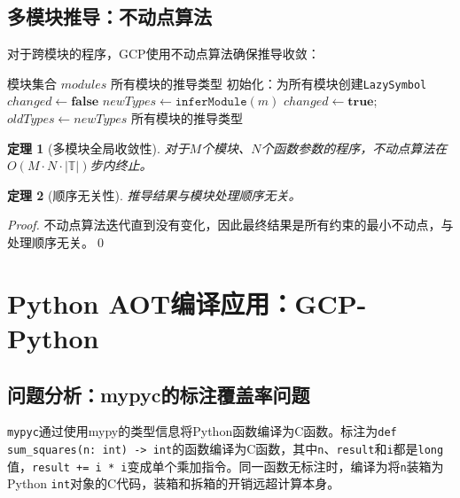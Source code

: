 \documentclass[UTF8]{article}
\newtheorem{theorem}{定理}[section]
\begin{document}
\subsection{多模块推导：不动点算法}
\label{sec:fixpoint}

对于跨模块的程序，GCP使用不动点算法确保推导收敛：

\begin{algorithm}[h]
\caption{多模块不动点推导}
\label{alg:fixpoint}
\begin{algorithmic}[1]
\REQUIRE 模块集合 $\mathit{modules}$
\ENSURE 所有模块的推导类型
\STATE 初始化：为所有模块创建\texttt{LazySymbol}
\REPEAT
  \STATE $\mathit{changed} \leftarrow \mathbf{false}$
    \STATE $\mathit{newTypes} \leftarrow \texttt{inferModule}(m)$
      \STATE $\mathit{changed} \leftarrow \mathbf{true}$;\quad $\mathit{oldTypes} \leftarrow \mathit{newTypes}$
    \ENDIF
  \ENDFOR
{}
\RETURN 所有模块的推导类型
\end{algorithmic}
\end{algorithm}

\begin{theorem}[多模块全局收敛性]
\label{thm:global-conv}
对于$M$个模块、$N$个函数参数的程序，不动点算法在$O(M \cdot N \cdot |\mathbb{T}|)$步内终止。
\end{theorem}

\begin{theorem}[顺序无关性]
\label{thm:order}
推导结果与模块处理顺序无关。
\end{theorem}

\begin{proof}
不动点算法迭代直到没有变化，因此最终结果是所有约束的最小不动点，与处理顺序无关。\qed
\end{proof}

\section{Python AOT编译应用：GCP-Python}
\label{sec:python}

\subsection{问题分析：mypyc的标注覆盖率问题}

\texttt{mypyc}通过使用mypy的类型信息将Python函数编译为C函数。标注为\texttt{def sum\_squares(n: int) -> int}的函数编译为C函数，其中\texttt{n}、\texttt{result}和\texttt{i}都是\texttt{long}值，\texttt{result += i * i}变成单个乘加指令。同一函数无标注时，编译为将\texttt{n}装箱为Python \texttt{int}对象的C代码，装箱和拆箱的开销远超计算本身。
\end{document}
